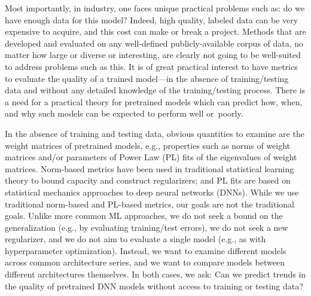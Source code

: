 Most importantly, in industry, one faces unique practical problems such as: do we have enough data for this model? 
Indeed, high quality, labeled data can be very expensive to acquire, and this cost can make or break a project.
Methods that are developed and evaluated on any well-defined publicly-available corpus of data, no matter how large or diverse or interesting, are clearly not going to be well-suited to address problems such as this.
It is of great practical interest to have metrics to evaluate the quality of a trained model---in the absence of training/testing data and without any detailed knowledge of the training/testing process.  
There is a need for a practical theory for pretrained models which can predict how, when, and why such models can be expected to perform well or~poorly.

In the absence of training and testing data, obvious quantities to examine are the weight matrices of pretrained models, e.g., 
properties such as norms of weight matrices and/or parameters of Power Law (PL) fits of the eigenvalues of weight matrices.
Norm-based metrics have been used in traditional statistical learning theory to bound capacity and construct regularizers; and PL fits are based on statistical mechanics approaches to deep neural networks (DNNs).
While we use traditional norm-based and PL-based metrics, our goals are not the traditional goals.
Unlike more common ML approaches, we do not seek a bound on the generalization (e.g., by evaluating training/test errors), we do not seek a new regularizer, and we do not aim to evaluate a single model (e.g., as with hyperparameter optimization).
Instead, we want to examine different models across common architecture series, and we want to compare models between different architectures themselves.
In both cases, we ask:
Can we predict trends in the quality of pretrained DNN models without access to training or testing data?  

